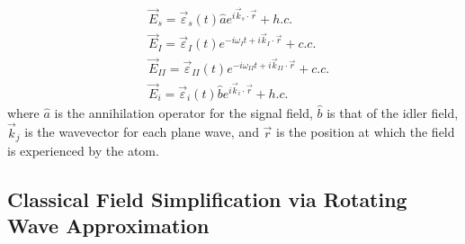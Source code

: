 \documentclass[aps,pra,showpacs,amsmath,amssymb,nofootinbib,longbibliography,superscriptaddress
]{revtex4-1}
\theoremstyle{definition}
\theoremstyle{remark}
\newcommand{\0}{\hat{0}}
\begin{document}
\begin{align}
    &\vec{E}_{s} = \vec{\varepsilon}_{s}(t) \hat{a} e^{i \vec{k}_{s} \cdot \vec{r}} + h.c.\\
    &\vec{E}_{I} = \vec{\varepsilon}_I(t) e^{-i \omega_I t + i \vec{k}_I \cdot \vec{r}} + c.c.\\
    &\vec{E}_{II} = \vec{\varepsilon}_{II}(t) e^{-i \omega_{II} t + i \vec{k}_{II} \cdot \vec{r}} + c.c.\\
    &\vec{E}_{i} = \vec{\varepsilon}_{i}(t) \hat{b} e^{i \vec{k}_{i} \cdot \vec{r}} + h.c.
\end{align}
where $\hat{a}$ is the annihilation operator for the signal field, $\hat{b}$ is that of the idler field, $\vec{k}_j$ is the wavevector for each plane wave, and $\vec{r}$ is the position at which the field is experienced by the atom. 

\subsection{Classical Field Simplification via Rotating Wave Approximation}
\end{document}
